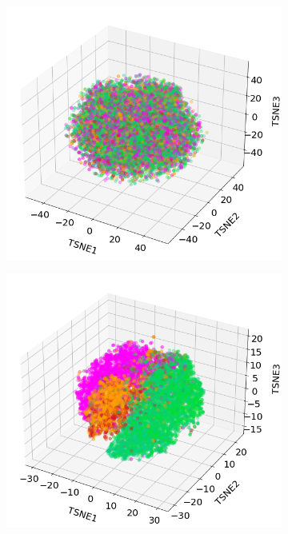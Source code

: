 \documentclass[journal,article,submit,pdftex,moreauthors]{Definitions/mdpi}
\providecommand{\DIFaddbeginFL}{} %
\providecommand{\DIFaddendFL}{} %
\providecommand{\DIFdelbeginFL}{} %
\providecommand{\DIFdelendFL}{} %
\begin{document}
\begin{figure}[H]
	\centering
	\DIFdelbeginFL %
\DIFdelendFL \DIFaddbeginFL \begin{subfigure}[t]{0.35\linewidth}
		\DIFaddendFL \centering
		\DIFdelbeginFL %
\DIFdelendFL \DIFaddbeginFL \includegraphics[width=0.9\linewidth]{figures/aes_1_layer_mse_results/s2_TSNE_v3.png}
		\DIFaddendFL \caption{}
	  \label{fig:pca_raw}
	\end{subfigure}
	\DIFdelbeginFL %
\DIFdelendFL \DIFaddbeginFL \begin{subfigure}[t]{0.35\linewidth}
		\DIFaddendFL \centering
		\DIFdelbeginFL %
\DIFdelendFL \DIFaddbeginFL \includegraphics[width=0.9\linewidth]{figures/aes_1_layer_mse_results/representations_TSNE_v5.png}

\end{subfigure}
\end{figure}
\end{document}
